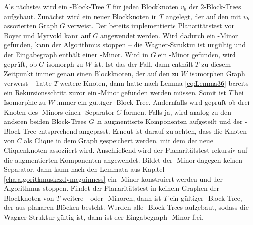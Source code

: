 Als nächstes wird ein \dd-Block-Tree $T$ für jeden Blockknoten $v_b$ der $2$-Block-Trees aufgebaut.
Zunächst wird ein neuer Blockknoten in $T$ angelegt, der auf den mit $v_b$ assozierten Graph $G$ verweist.
Der bereits implementierte Planaritätstest von Boyer und Myrvold \cite{BoM04} kann auf $G$ angewendet werden.
Wird dadurch ein \kf-Minor gefunden, kann der Algorithmus stoppen -- die Wagner-Struktur ist ungültig und der Eingabegraph enthält einen \kf-Minor.
Wird in $G$ ein \kdd-Minor gefunden, wird geprüft, ob $G$ isomorph zu $W$ ist.
Ist das der Fall, dann enthält $T$ zu diesem Zeitpunkt immer genau einen Blockknoten, der auf den zu $W$ isomorphen Graph verweist -- hätte $T$ weitere Knoten, dann hätte nach Lemma \ref{eq:Lemma36} bereits ein Rekursionsschritt zuvor ein \kf-Minor gefunden werden müssen.
Somit ist $T$ bei Isomorphie zu $W$ immer ein gültiger \dd-Block-Tree.
Andernfalls wird geprüft ob drei Knoten des \kdd-Minors einen \dd-Separator $C$ formen.
Falls ja, wird analog zu den anderen beiden Block-Trees $G$ in augmentierte Komponenten aufgeteilt und der \dd-Block-Tree entsprechend angepasst.
Erneut ist darauf zu achten, dass die Knoten von $C$ als Clique in dem Graph gespeichert werden, mit dem der neue Cliquenknoten assoziiert wird.
Anschließend wird der Planaritätstest rekursiv auf die augmentierten Komponenten angewendet.
Bildet der \kdd-Minor dagegen keinen \dd-Separator, dann kann nach den Lemmata aus Kapitel \ref{cha:algorithmuskezdymcguinness} ein \kf-Minor konstruiert werden und der Algorithmus stoppen.
Findet der Planaritätstest in keinem Graphen der Blockknoten von $T$ weitere \kf- oder \kdd-Minoren, dann ist $T$ ein gültiger \dd-Block-Tree, der aus planaren Blöcken besteht.
Wurden alle \dd-Block-Trees aufgebaut, sodass die Wagner-Struktur gültig ist, dann ist der Eingabegraph \kf-Minor-frei.

